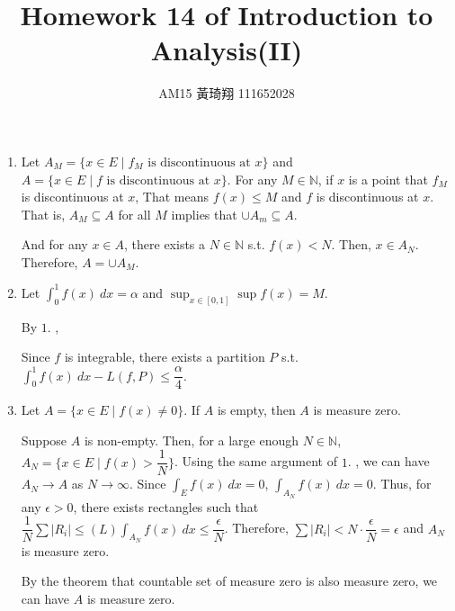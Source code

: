 \documentclass[12pt]{article}
\title{Homework 14 of Introduction to Analysis(II)}
\author{AM15 黃琦翔 111652028}
\begin{document}
\maketitle
\begin{enumerate}
    \item Let $A_M = \{x \in E \mid f_M\text{ is discontinuous at } x\}$ and $A = \{ x\in E \mid f\text{ is discontinuous at } x\}$.
    For any $M \in \mathbb{N}$, if $x$ is a point that $f_M$ is discontinuous at $x$, 
    That means $f(x) \leq M$ and $f$ is discontinuous at $x$.
    That is, $A_M \subseteq A$ for all $M$ implies that $\cup A_m \subseteq A$.

    And for any $x \in A$, there exists a $N \in \mathbb{N}$ s.t. $f(x) < N$.
    Then, $x \in A_N$.
    Therefore, $A = \cup A_M$.

    \item Let $\displaystyle\int_0^1 f(x)\ dx = \alpha$ and $\displaystyle\sup_{x\in [0, 1]} \sup f(x) = M$.
    
    By $1$. , 
    
    Since $f$ is integrable, there exists a partition $P$ s.t. $\int_{0}^{1} f(x)\ dx - L(f, P) \leq \dfrac{\alpha}{4}$.

    \item Let $A = \{x \in E\mid f(x)\neq 0\}$. If $A$ is empty, then $A$ is measure zero.
    
    Suppose $A$ is non-empty.
    Then, for a large enough $N\in \mathbb{N}$, $A_N = \{x\in E\mid f(x) > \dfrac{1}{N}\}$.
    Using the same argument of $1$. , we can have $A_N \to A$ as $N \to \infty$.
    Since $\displaystyle\int_{E} f(x)\ dx = 0$, $\displaystyle\int_{A_N} f(x)\ dx = 0$.
    Thus, for any $\epsilon > 0$, there exists rectangles such that $\dfrac{1}{N}\sum |R_i| \leq (L)\displaystyle\int_{A_N} f(x)\ dx \leq \dfrac{\epsilon}{N}$.
    Therefore, $\sum |R_i| < N \cdot \dfrac{\epsilon}{N} = \epsilon$ and $A_N$ is measure zero.
    
    By the theorem that countable set of measure zero is also measure zero, we can have $A$ is measure zero.
\end{enumerate}
\end{document}
